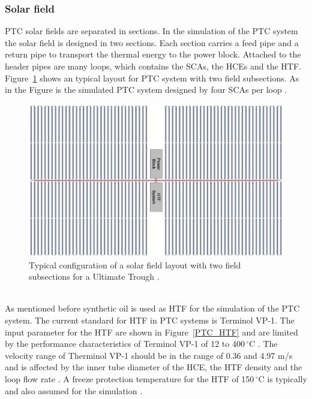\documentclass[Master,MEE,english]{twbook}%
\begin{document}
\subsubsection{Solar field}
PTC solar fields are separated in sections. In the simulation of the PTC system the solar field is designed in two sections. Each section carries a feed pipe and a return pipe to transport the thermal energy to the power block. Attached to the header pipes are many loops, which contains the SCAs, the HCEs and the HTF. Figure~\ref{PTC_Field_ultimate} shows an typical layout for PTC system with two field subsections. As in the Figure is the simulated PTC system designed by four SCAs per loop \cite{Riffelmann2014}.
\begin{figure}[htbp]  
\centering
\includegraphics[width=0.9\linewidth]{FIG/PTC_Field_ultimate}
\caption[Typical configuration of a solar field layout with two field subsections for a Ultimate Trough.]{Typical configuration of a solar field layout with two field subsections for a Ultimate Trough \cite{Riffelmann2014}.}\label{PTC_Field_ultimate}
\end{figure}
\\
As mentioned before synthetic oil is used as HTF for the simulation of the PTC system. The current standard for HTF in PTC systems is Terminol VP-1. The input parameter for the HTF are shown in Figure~\ref{PTC_HTF} and are limited by the performance characteristics of Terminol VP-1 of 12 to 400$\,^{\circ}\mathrm{C}$ \cite{Therminol2015}. The velocity range of Therminol VP-1 should be in the range of 0.36 and 4.97 m/s \cite{Wagner2014} and is affected by the inner tube diameter of the HCE, the HTF density and the loop flow rate \cite{NREL2015a}. A freeze protection temperature for the HTF of 150$\,^{\circ}\mathrm{C}$ is typically and also assumed for the simulation \cite{Kearney2002}.
\end{document}
